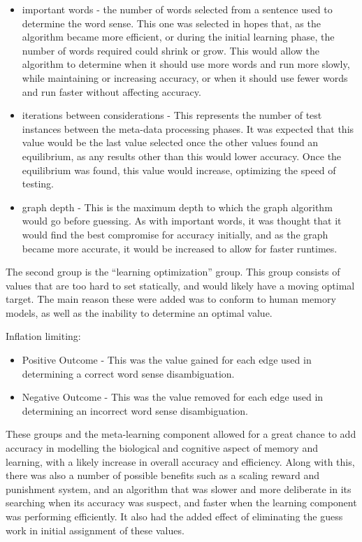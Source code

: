 \begin{itemize}
\item important words - the number of words selected from a sentence used to 
determine the word sense. This one was selected in hopes that, as the algorithm 
became more efficient, or during the initial learning phase, the number of words 
required could shrink or grow. This would allow the algorithm to determine when 
it should use more words and run more slowly, while maintaining or increasing 
accuracy, or when it should use fewer words and run faster without affecting 
accuracy.     

\item iterations between considerations - This represents the number of test 
instances between the meta-data processing phases. It was expected that this value would be 
the last value selected once the other values found an equilibrium, as any 
results other than this would lower accuracy. Once the equilibrium was found, 
this value would increase, optimizing the speed of testing.

\item graph depth - This is the maximum depth to which the graph algorithm would go before 
guessing.  As with important words, it was thought that it would find the best 
compromise for accuracy initially, and as the graph became more accurate, it 
would be increased to allow for faster runtimes.

\end{itemize}

The second group is the ``learning optimization'' group.  This group consists of
values that are too hard to set statically, and would likely have a moving optimal 
target. The main reason these were added was to conform to human memory models, as well 
as the inability to determine an optimal value.

Inflation limiting: 
\begin{itemize}     
\item Positive Outcome - This was the value gained for each edge used in 
determining a correct word sense disambiguation.      
\item Negative Outcome - This was the value removed for each edge used in 
determining an incorrect word sense disambiguation.
\end{itemize}

These groups and the meta-learning component allowed for a great chance to add
accuracy in modelling the biological and cognitive aspect of memory and learning,
with a likely increase in overall accuracy and efficiency. Along with
this, there was also a number of possible benefits such as a scaling reward and
punishment system, and an algorithm that was slower and more deliberate in its
searching when its accuracy was suspect, and faster when the learning component
was performing efficiently. It also had the added effect of eliminating the guess work
in initial assignment of these values.
